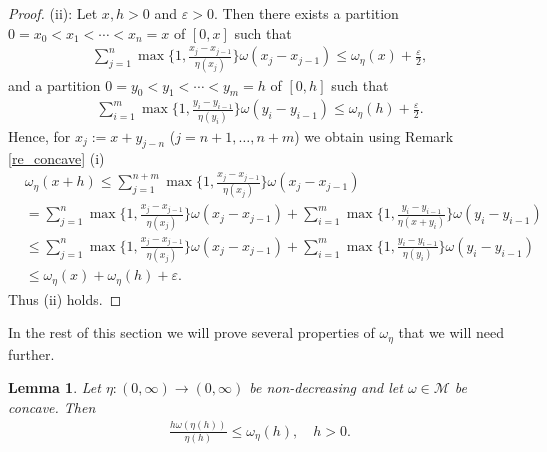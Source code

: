 \documentclass[10pt,a4paper]{amsart}
\newtheorem{lemma}[theorem]{Lemma}
\theoremstyle{definition}
\newcommand{\M}{\mathcal{M}}
\begin{document}
\begin{proof}
(ii): Let $ x,h>0 $ and $ \varepsilon>0 $. Then there exists a partition $ 0=x_0<x_1<\cdots<x_n=x $ of $ [0,x] $ such that
\begin{align*}
\sum_{j=1}^{n}\max\bigg\lbrace 1,\frac{x_j-x_{j-1}}{\eta(x_j)}\bigg\rbrace\omega(x_j-x_{j-1})\leq\omega_{\eta}(x)+\frac{\varepsilon}{2},
\end{align*}
and a partition $ 0=y_0<y_1<\cdots<y_m=h $ of $ [0,h] $ such that
\begin{align*}
\sum_{i=1}^{m}\max\bigg\lbrace 1,\frac{y_i-y_{i-1}}{\eta(y_i)}\bigg\rbrace\omega(y_i-y_{i-1})\leq\omega_{\eta}(h)+\frac{\varepsilon}{2}.
\end{align*}
Hence, for $ x_j:=x+y_{j-n} $ ($ j=n+1,\dots,n+m $) we obtain using Remark \ref{re_concave} (i)
\begin{align*}
&\omega_{\eta}(x+h)\leq\sum_{j=1}^{n+m}\max\bigg\lbrace 1,\frac{x_j-x_{j-1}}{\eta(x_j)}\bigg\rbrace\omega(x_j-x_{j-1})\\
&=\sum_{j=1}^{n}\max\bigg\lbrace 1,\frac{x_j-x_{j-1}}{\eta(x_j)}\bigg\rbrace\omega(x_j-x_{j-1})+\sum_{i=1}^{m}\max\bigg\lbrace 1,\frac{y_i-y_{i-1}}{\eta(x+y_i)}\bigg\rbrace\omega(y_i-y_{i-1})\\
&\leq\sum_{j=1}^{n}\max\bigg\lbrace 1,\frac{x_j-x_{j-1}}{\eta(x_j)}\bigg\rbrace\omega(x_j-x_{j-1})+\sum_{i=1}^{m}\max\bigg\lbrace 1,\frac{y_i-y_{i-1}}{\eta(y_i)}\bigg\rbrace\omega(y_i-y_{i-1})\\
&\leq\omega_{\eta}(x)+\omega_{\eta}(h)+\varepsilon.
\end{align*}
Thus (ii) holds.
\end{proof}



In the rest of this section we will prove several properties of $ \omega_{\eta} $ that we will need further.

\begin{lemma}\label{le_lowerestimate}
Let $ \eta:(0,\infty)\to(0,\infty) $ be non-decreasing and let $ \omega\in\M $ be concave. Then
\begin{align}\label{eq_lowerestimate}
\frac{h\omega(\eta(h))}{\eta(h)}\leq\omega_{\eta}(h),\quad h>0.
\end{align}
\end{lemma}
\end{document}
